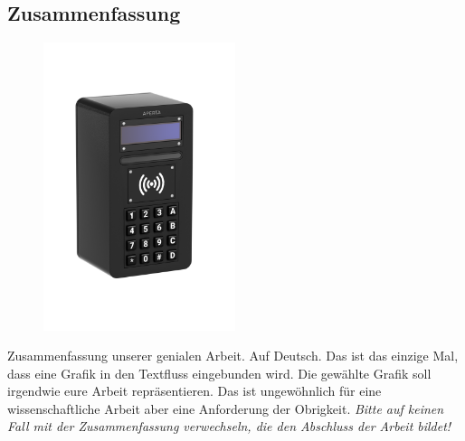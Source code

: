 \lipsum[6]
\newpage
\begin{spacing}{1}
    \chapter*{Zusammenfassung}
\end{spacing}
\begin{figure}
    \begin{center}
      \includegraphics[width=0.5\textwidth]{pics/all-in-package.png}
    \end{center}
\end{figure}

Zusammenfassung unserer genialen Arbeit. Auf Deutsch.
Das ist das einzige Mal, dass eine Grafik in den Textfluss eingebunden wird.
Die gewählte Grafik soll irgendwie eure Arbeit repräsentieren.
Das ist ungewöhnlich für eine wissenschaftliche Arbeit aber eine Anforderung der Obrigkeit.
\emph{Bitte auf keinen Fall mit der Zusammenfassung verwechseln, die den Abschluss der Arbeit bildet!}
\lipsum[6]
